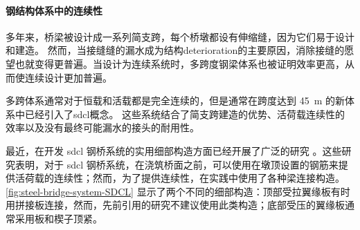 \paragraph{钢结构体系中的连续性}

多年来，桥梁被设计成一系列简支跨，每个桥墩都设有伸缩缝，因为它们易于设计和建造。 然而，当接缝缝的漏水成为结构\gls*{deterioration}的主要原因，消除接缝的愿望也就变得更普遍。当设计为连续系统时，多跨度钢梁体系也被证明效率更高，从而使连续设计更加普遍。

多跨体系通常对于恒载和活载都是完全连续的，但是通常在跨度达到 \qty{45}{m} 的新体系中已经引入了\gls{sdcl}概念。 这些系统结合了简支跨建造的优势、活荷载连续性的效率以及没有最终可能漏水的接头的耐用性。

最近，在开发 \gls*{sdcl} 钢桥系统的实用细部构造方面已经开展了广泛的研究 \cite{azizinamini2003t,azizinamini2005d1,azizinamini2005d2,azizinamini2014s,lampe2013d,farimani2014n,yakel2014f,javidi2013e} 。这些研究表明，对于 \gls*{sdcl} 钢桥系统，在浇筑桥面之前，可以使用在墩顶设置的钢筋来提供活荷载的连续性；然而，为了提供连续性，在实践中使用了各种梁连接构造。\cref{fig:steel-bridge-system-SDCL} 显示了两个不同的细部构造：顶部受拉翼缘板有时用拼接板连接，然而，先前引用的研究不建议使用此类构造；底部受压的翼缘板通常采用板和楔子顶紧。

